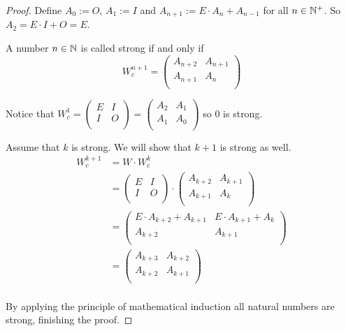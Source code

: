 \begin{proof}
  Define $A_{0} := O$, $A_{1} := I$ and 
  $A_{n+1} := E \cdot A_{n} + A_{n-1}$ for all $n\in\mathbb{N}^{+}$. So 
  $A_{2} = E \cdot I + O = E$. 

  A number $n\in\mathbb{N}$ is called strong if and only if
  \[
  W_{c}^{n+1}
  =
  \left(
  \begin{array}{cc}
    A_{n+2} & A_{n+1} \\
    A_{n+1} & A_{n}   \\
  \end{array}
  \right)  
  \]

  Notice that
  $W_{c}^{1} = \left(\begin{smallmatrix} E & I \\ I & O \\\end{smallmatrix}\right) = \left(\begin{smallmatrix} A_{2} & A_{1} \\ A_{1} & A_{0} \\\end{smallmatrix}\right)$
  so 0 is strong.

  Assume that $k$ is strong. We will show that $k+1$ is strong as well.
  \[
  \begin{aligned}
  W_{c}^{k+1} 
  & = W \cdot W_{c}^{k} \\
  & = 
  \left(
  \begin{array}{cc}
    E & I \\
    I & O \\
  \end{array}
  \right)
  \cdot
  \left(
  \begin{array}{cc}
    A_{k+2} & A_{k+1} \\
    A_{k+1} & A_{k}   \\
  \end{array}
  \right) \\
  & = 
  \left(
  \begin{array}{cc}
    E \cdot A_{k+2}  + A_{k+1} & E \cdot A_{k+1} + A_{k} \\
    A_{k+2}                   & A_{k+1}                \\
  \end{array}
  \right) \\
  & =
  \left(
  \begin{array}{cc}
    A_{k+3} & A_{k+2} \\
    A_{k+2} & A_{k+1} \\
  \end{array}
  \right) \\
  \end{aligned}
  \]

  By applying the principle of mathematical induction all natural
  numbers are strong, finishing the proof.
\end{proof}

